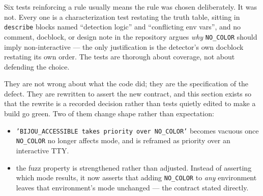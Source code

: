 Six tests reinforcing a rule usually means the rule was chosen deliberately. It was not. Every one is a characterization test restating the truth table, sitting in \texttt{d\allowbreak{}e\allowbreak{}s\allowbreak{}c\allowbreak{}r\allowbreak{}i\allowbreak{}b\allowbreak{}e} blocks named ``detection logic'' and ``conflicting env vars'', and no comment, docblock, or design note in the repository argues \emph{why} \texttt{N\allowbreak{}O\allowbreak{}\_\allowbreak{}C\allowbreak{}O\allowbreak{}L\allowbreak{}O\allowbreak{}R} should imply non-interactive --- the only justification is the detector's own docblock restating its own order. The tests are thorough about coverage, not about defending the choice.

They are not wrong about what the code did; they are the specification of the defect. They are rewritten to assert the new contract, and this section exists so that the rewrite is a recorded decision rather than tests quietly edited to make a build go green. Two of them change shape rather than expectation:

\begin{itemize}
\tightlist
\item
  \texttt{'\allowbreak{}B\allowbreak{}I\allowbreak{}J\allowbreak{}O\allowbreak{}U\allowbreak{}\_\allowbreak{}A\allowbreak{}C\allowbreak{}C\allowbreak{}E\allowbreak{}S\allowbreak{}S\allowbreak{}I\allowbreak{}B\allowbreak{}L\allowbreak{}E\allowbreak{} \allowbreak{}t\allowbreak{}a\allowbreak{}k\allowbreak{}e\allowbreak{}s\allowbreak{} \allowbreak{}p\allowbreak{}r\allowbreak{}i\allowbreak{}o\allowbreak{}r\allowbreak{}i\allowbreak{}t\allowbreak{}y\allowbreak{} \allowbreak{}o\allowbreak{}v\allowbreak{}e\allowbreak{}r\allowbreak{} \allowbreak{}N\allowbreak{}O\allowbreak{}\_\allowbreak{}C\allowbreak{}O\allowbreak{}L\allowbreak{}O\allowbreak{}R\allowbreak{}'} becomes vacuous once \texttt{N\allowbreak{}O\allowbreak{}\_\allowbreak{}C\allowbreak{}O\allowbreak{}L\allowbreak{}O\allowbreak{}R} no longer affects mode, and is reframed as priority over an interactive TTY.
\item
  the fuzz property is strengthened rather than adjusted. Instead of asserting which mode results, it now asserts that adding \texttt{N\allowbreak{}O\allowbreak{}\_\allowbreak{}C\allowbreak{}O\allowbreak{}L\allowbreak{}O\allowbreak{}R} to \emph{any} environment leaves that environment's mode unchanged --- the contract stated directly.
\end{itemize}

